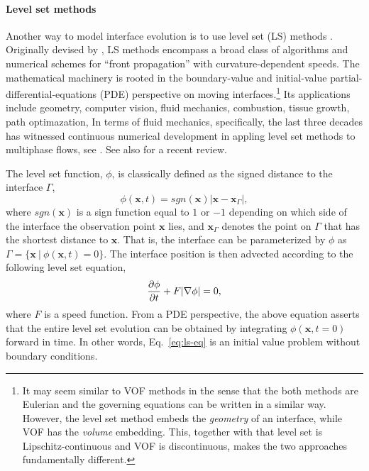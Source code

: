 \medskip
\paragraph{\bf Level set methods}

Another way to model interface evolution is to use level set (LS) methods \citep{sethian_1999a}.
Originally devised by \cite{Osher_Sethian_levelset}, LS methods encompass a broad class of algorithms and numerical schemes for ``front propagation'' with curvature-dependent speeds.
The mathematical machinery is rooted in the boundary-value and initial-value partial-differential-equations (PDE) perspective on moving interfaces.\footnote{It may seem similar to VOF methods in the sense that the both methods are Eulerian and the governing equations can be written in a similar way. However, the level set method embeds the \emph{geometry} of an interface, while VOF has the \emph{volume} embedding. This, together with that level set is Lipschitz-continuous and VOF is discontinuous, makes the two approaches fundamentally different.}
Its applications include geometry, computer vision, fluid mechanics, combustion, tissue growth, path optimazation, \etc
In terms of fluid mechanics, specifically, the last three decades has witnessed continuous numerical development in appling level set methods to multiphase flows, see \eg \cite{Mulder_JCP_1992, Sussman_JCP_1994, Sussman_JCP_2000, Enright_JCP_2002, Olsson_JCP_2005, Marchandise_JCP_2007, Desjardins_JCP_2008, Desjardins_JCP_2009, Aanjaneya_JCP_2013, Luo_JCP_2015, ICLS}. See also \cite{Gibou_Fedkiv_Osher} for a recent review.

The level set function, $\phi$, is classically defined as the signed distance to the interface $\Gamma$,
\begin{equation} \label{eq:ls-def}
    \phi({\bm x},t) = sgn({\bm x}) |{\bm x}-{\bm x}_\Gamma|,
\end{equation}
where $sgn({\bm x})$ is a sign function equal to $1$ or $-1$ depending on which side of the interface the observation point $\bm x$ lies, and ${\bm x}_\Gamma$ denotes the point on $\Gamma$ that has the shortest distance to $\bm x$.
That is, the interface can be parameterized by $\phi$ as $\Gamma = \{ {\bm x} ~ \rvert ~ \phi({\bm x},t) = 0 \}$.
The interface position is then advected according to the following level set equation,
\begin{equation} \label{eq:ls-eq}
  \frac{\partial \phi}{\partial t} + F \lvert\nabla \phi\rvert = 0,
\end{equation}
where $F$ is a speed function.
From a PDE perspective, the above equation asserts that the entire level set evolution can be obtained by integrating $\phi({\bm x},t=0)$ forward in time.
In other words, Eq.\ \eqref{eq:ls-eq} is an initial value problem without boundary conditions.

